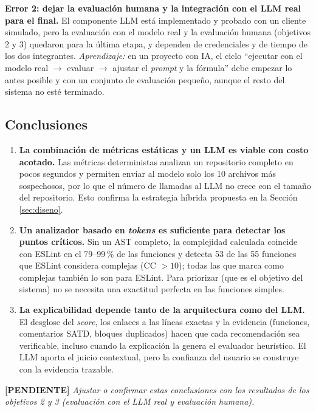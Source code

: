 \textbf{Error 2: dejar la evaluación humana y la integración con el LLM real para el final.} El componente LLM está implementado y probado con un cliente simulado, pero la evaluación con el modelo real y la evaluación humana (objetivos 2 y 3) quedaron para la última etapa, y dependen de credenciales y de tiempo de los dos integrantes. \textit{Aprendizaje:} en un proyecto con IA, el ciclo ``ejecutar con el modelo real $\to$ evaluar $\to$ ajustar el \textit{prompt} y la fórmula'' debe empezar lo antes posible y con un conjunto de evaluación pequeño, aunque el resto del sistema no esté terminado.

\subsection{Conclusiones}

\begin{enumerate}
    \item \textbf{La combinación de métricas estáticas y un LLM es viable con costo acotado.} Las métricas deterministas analizan un repositorio completo en pocos segundos y permiten enviar al modelo solo los 10 archivos más sospechosos, por lo que el número de llamadas al LLM no crece con el tamaño del repositorio. Esto confirma la estrategia híbrida propuesta en la Sección \ref{sec:diseno}.
    \item \textbf{Un analizador basado en \textit{tokens} es suficiente para detectar los puntos críticos.} Sin un AST completo, la complejidad calculada coincide con ESLint en el 79--99\,\% de las funciones y detecta 53 de las 55 funciones que ESLint considera complejas (CC $> 10$); todas las que marca como complejas también lo son para ESLint. Para priorizar (que es el objetivo del sistema) no se necesita una exactitud perfecta en las funciones simples.
    \item \textbf{La explicabilidad depende tanto de la arquitectura como del LLM.} El desglose del \textit{score}, los enlaces a las líneas exactas y la evidencia (funciones, comentarios SATD, bloques duplicados) hacen que cada recomendación sea verificable, incluso cuando la explicación la genera el evaluador heurístico. El LLM aporta el juicio contextual, pero la confianza del usuario se construye con la evidencia trazable.
\end{enumerate}

\textbf{[PENDIENTE]} \textit{Ajustar o confirmar estas conclusiones con los resultados de los objetivos 2 y 3 (evaluación con el LLM real y evaluación humana).}

